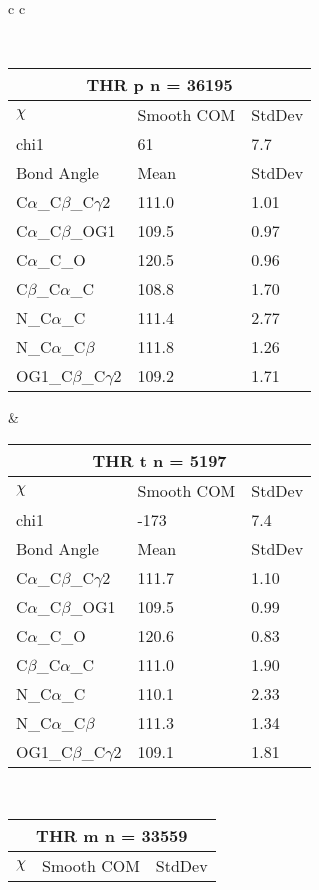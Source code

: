 \newpage

\begin{longtable}{ c c }

\caption{THR Central Values}\\
  \begin{tabular}{ l l l }
  \toprule
  \multicolumn{3}{c}{THR \textbf{p} n = 36195} \\ \toprule
  $\chi$       & Smooth COM & StdDev \\ \midrule
  chi1 & 61 & 7.7 \\ \midrule
  Bond Angle   & Mean     & StdDev \\ \midrule
  C$\alpha$\_C$\beta$\_C$\gamma$2 & 111.0 & 1.01\\
  C$\alpha$\_C$\beta$\_OG1 & 109.5 & 0.97\\
  C$\alpha$\_C\_O & 120.5 & 0.96\\
  C$\beta$\_C$\alpha$\_C & 108.8 & 1.70\\
  N\_C$\alpha$\_C & 111.4 & 2.77\\
  N\_C$\alpha$\_C$\beta$ & 111.8 & 1.26\\
  OG1\_C$\beta$\_C$\gamma$2 & 109.2 & 1.71\\
  \bottomrule
  \end{tabular}
  &
  \begin{tabular}{ l l l }
  \toprule
  \multicolumn{3}{c}{THR \textbf{t} n = 5197} \\ \toprule
  $\chi$       & Smooth COM & StdDev \\ \midrule
  chi1 & -173 & 7.4 \\ \midrule
  Bond Angle   & Mean     & StdDev \\ \midrule
  C$\alpha$\_C$\beta$\_C$\gamma$2 & 111.7 & 1.10\\
  C$\alpha$\_C$\beta$\_OG1 & 109.5 & 0.99\\
  C$\alpha$\_C\_O & 120.6 & 0.83\\
  C$\beta$\_C$\alpha$\_C & 111.0 & 1.90\\
  N\_C$\alpha$\_C & 110.1 & 2.33\\
  N\_C$\alpha$\_C$\beta$ & 111.3 & 1.34\\
  OG1\_C$\beta$\_C$\gamma$2 & 109.1 & 1.81\\
  \bottomrule
  \end{tabular}
  \\
  \begin{tabular}{ l l l }
  \toprule
  \multicolumn{3}{c}{THR \textbf{m} n = 33559} \\ \toprule
  $\chi$       & Smooth COM & StdDev \\ \midrule

\end{tabular}
\end{longtable}
